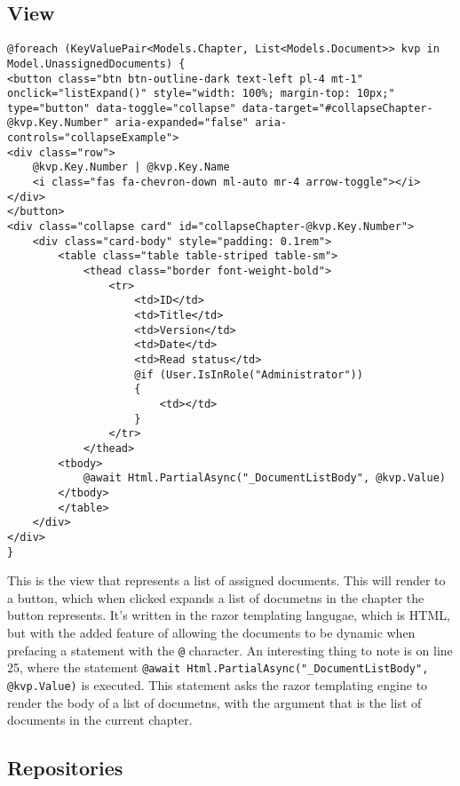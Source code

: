 \subsection{View}

\begin{lstlisting}
@foreach (KeyValuePair<Models.Chapter, List<Models.Document>> kvp in Model.UnassignedDocuments) {
<button class="btn btn-outline-dark text-left pl-4 mt-1" onclick="listExpand()" style="width: 100%; margin-top: 10px;" type="button" data-toggle="collapse" data-target="#collapseChapter-@kvp.Key.Number" aria-expanded="false" aria-controls="collapseExample">
<div class="row">
	@kvp.Key.Number | @kvp.Key.Name
	<i class="fas fa-chevron-down ml-auto mr-4 arrow-toggle"></i>
</div>
</button>
<div class="collapse card" id="collapseChapter-@kvp.Key.Number">
	<div class="card-body" style="padding: 0.1rem">
		<table class="table table-striped table-sm">
			<thead class="border font-weight-bold">
				<tr>
					<td>ID</td>
					<td>Title</td>
					<td>Version</td>
					<td>Date</td>
					<td>Read status</td>
					@if (User.IsInRole("Administrator"))
					{
						<td></td>
					}
				</tr>
			</thead>
		<tbody>
			@await Html.PartialAsync("_DocumentListBody", @kvp.Value)
		</tbody>
		</table>
	</div>
</div>
}

\end{lstlisting}
This is the view that represents a list of assigned documents. This will render to a button, which when clicked expands a list of documetns in the chapter the button represents.
It's written in the razor templating langugae, which is HTML, but with the added feature of allowing the documents to be dynamic when prefacing a statement with the \texttt{@} character.
An interesting thing to note is on line 25, where the statement \texttt{@await Html.PartialAsync("_DocumentListBody", @kvp.Value)} is executed.
This statement asks the razor templating engine to render the body of a list of documetns, with the argument that is the list of documents in the current chapter.

\subsection{Repositories}

